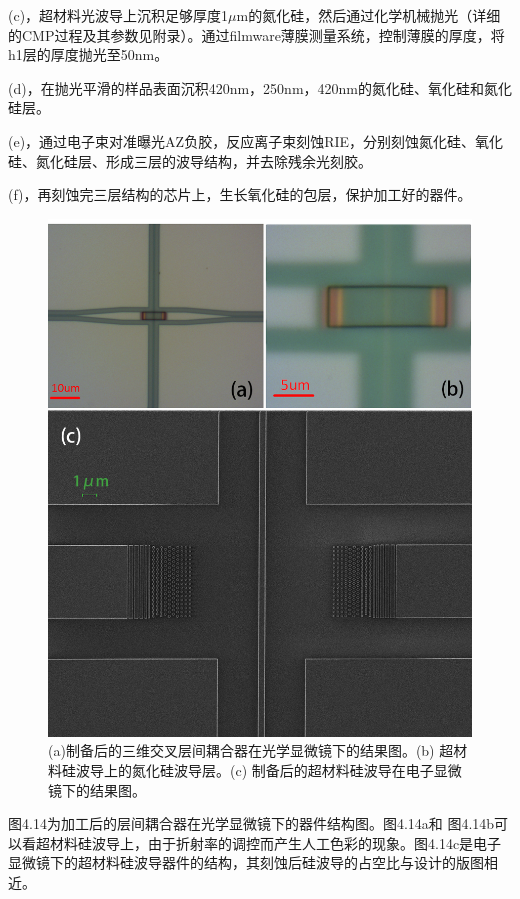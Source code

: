 (c)，超材料光波导上沉积足够厚度1$\mu$m的氮化硅，然后通过化学机械抛光（详细的CMP过程及其参数见附录）。通过filmware薄膜测量系统，控制薄膜的厚度，将h1层的厚度抛光至50nm。 

(d)，在抛光平滑的样品表面沉积420nm，250nm，420nm的氮化硅、氧化硅和氮化硅层。

(e)，通过电子束对准曝光AZ负胶，反应离子束刻蚀RIE，分别刻蚀氮化硅、氧化硅、氮化硅层、形成三层的波导结构，并去除残余光刻胶。

(f)，再刻蚀完三层结构的芯片上，生长氧化硅的包层，保护加工好的器件。

\begin{figure}[!htbp]
    \centering
    \includegraphics[width=1\textwidth]{Img/4-14.png}
    \caption{(a)制备后的三维交叉层间耦合器在光学显微镜下的结果图。(b) 超材料硅波导上的氮化硅波导层。(c) 制备后的超材料硅波导在电子显微镜下的结果图。}
    \label{fig:4-14}
\end{figure}

图4.14为加工后的层间耦合器在光学显微镜下的器件结构图。图4.14a和 图4.14b可以看超材料硅波导上，由于折射率的调控而产生人工色彩的现象。图4.14c是电子显微镜下的超材料硅波导器件的结构，其刻蚀后硅波导的占空比与设计的版图相近。

